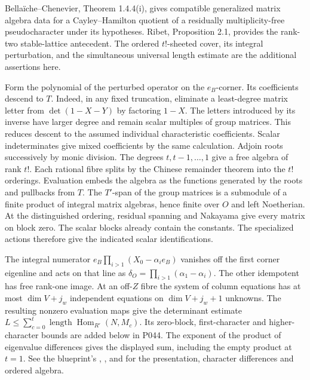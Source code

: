 Bellaïche--Chenevier, Theorem 1.4.4(i), gives compatible generalized matrix algebra data for a Cayley--Hamilton quotient of a residually multiplicity-free pseudocharacter under its hypotheses. Ribet, Proposition 2.1, provides the rank-two stable-lattice antecedent. The ordered \(t!\)-sheeted cover, its integral perturbation, and the simultaneous universal length estimate are the additional assertions here.
\begin{outline}
Form the polynomial of the perturbed operator on the \(e_B\)-corner. Its coefficients descend to \(T\). Indeed, in any fixed truncation, eliminate a least-degree matrix letter from \(\det(1-X-Y)\) by factoring \(1-X\). The letters introduced by its inverse have larger degree and remain scalar multiples of group matrices. This reduces descent to the assumed individual characteristic coefficients. Scalar indeterminates give mixed coefficients by the same calculation. Adjoin roots successively by monic division. The degrees \(t,t-1,\ldots,1\) give a free algebra of rank \(t!\). Each rational fibre splits by the Chinese remainder theorem into the \(t!\) orderings. Evaluation embeds the algebra as the functions generated by the roots and pullbacks from \(T\). The \(T'\)-span of the group matrices is a submodule of a finite product of integral matrix algebras, hence finite over \(O\) and left Noetherian. At the distinguished ordering, residual spanning and Nakayama give every matrix on block zero. The scalar blocks already contain the constants. The specialized actions therefore give the indicated scalar identifications.

The integral numerator \(e_B\prod_{i>1}(X_0-\alpha_i e_B)\) vanishes off the first corner eigenline and acts on that line as \(\delta_O=\prod_{i>1}(\alpha_1-\alpha_i)\). The other idempotent has free rank-one image. At an off-\(Z\) fibre the system of column equations has at most \(\dim V+j_w\) independent equations on \(\dim V+j_w+1\) unknowns. The resulting nonzero evaluation maps give the determinant estimate \(L\le\sum_{c=0}^t\operatorname{length}\operatorname{Hom}_{R'}(N,M_c)\). Its zero-block, first-character and higher-character bounds are added below in P044. The exponent of the product of eigenvalue differences gives the displayed sum, including the empty product at \(t=1\). See the blueprint's , , and  for the presentation, character differences and ordered algebra.
\end{outline}

